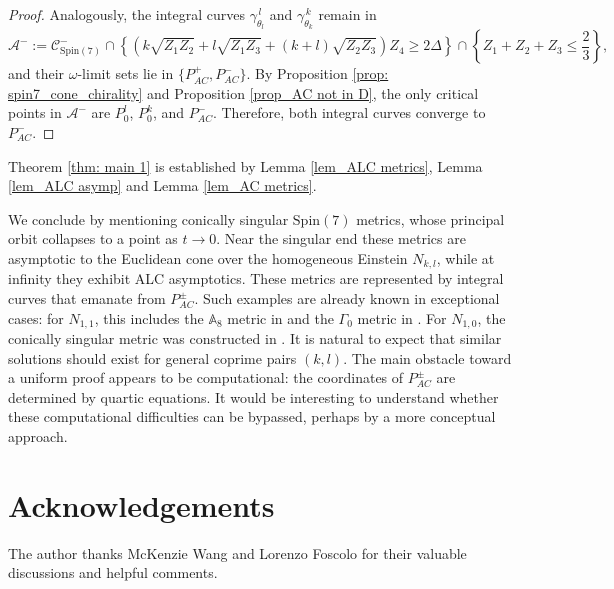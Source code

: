 \documentclass[11pt,letterpaper]{amsart}
\theoremstyle{definition}
\numberwithin{equation}{section}
\newcommand{\spin}{\mathrm{Spin}}
\begin{document}
\begin{proof}
Analogously, the integral curves $\gamma_{\theta_l}^{\,l}$ and $\gamma_{\theta_k}^{\,k}$ remain in
$$
\mathcal{A}^-:=\mathcal{C}_{\spin(7)}^-\cap \left\{\left(k\sqrt{Z_1Z_2}+l\sqrt{Z_1Z_3}+(k+l)\sqrt{Z_2Z_3}\right)Z_4\geq 2\Delta\right\}\cap \left\{Z_1+Z_2+Z_3\leq \frac{2}{3}\right\},
$$ 
and their $\omega$-limit sets lie in $\{P_{AC}^+,P_{AC}^-\}$.
By Proposition \ref{prop: spin7_cone_chirality} and Proposition \ref{prop_AC not in D},
the only critical points in $\mathcal{A}^-$ are $P_0^l$, $P_0^k$, and $P_{AC}^-$.  Therefore, both integral curves converge to $P_{AC}^-$.
\end{proof}

Theorem \ref{thm: main 1} is established by Lemma \ref{lem_ALC metrics}, Lemma \ref{lem_ALC asymp} and Lemma \ref{lem_AC metrics}.

We conclude by mentioning conically singular $\spin(7)$ metrics, whose principal orbit collapses to a point as $t\to 0$. Near the singular end these metrics are asymptotic to the Euclidean cone over the homogeneous Einstein $N_{k,l}$, while at infinity they exhibit ALC asymptotics. These metrics are represented by integral curves that emanate from $P_{AC}^\pm$. Such examples are already known in exceptional cases: for $N_{1,1}$, this includes the $\mathbb{A}_8$ metric in \cite{cvetic_cohomogeneity_2002} and the $\Gamma_0$ metric in \cite[Theorem 1.3]{chi_einstein_2020}. For $N_{1,0}$, the conically singular metric was constructed in \cite{lehmann2022geometric}. It is natural to expect that similar solutions should exist for general coprime pairs $(k,l)$. The main obstacle toward a uniform proof appears to be computational: the coordinates of $P_{AC}^\pm$ are determined by quartic equations. It would be interesting to understand whether these computational difficulties can be bypassed, perhaps by a more conceptual approach.

\section*{Acknowledgements}
The author thanks McKenzie Wang and Lorenzo Foscolo for their valuable discussions and helpful comments.



\end{document}
